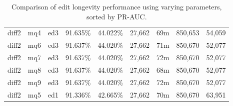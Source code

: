 \begin{sidewaystable}[!tp]
\begin{center}
\begin{tabular}{|c|c|c||c|c||c|c|c|c|}
diff2 & mq4 & ed3 & 91.635\% & 44.022\% & 27,662 & 69m & 850,653 & 54,059 \\
diff2 & mq6 & ed3 & 91.637\% & 44.020\% & 27,662 & 71m & 850,670 & 52,077 \\
diff2 & mq7 & ed3 & 91.637\% & 44.020\% & 27,662 & 72m & 850,670 & 52,077 \\
diff2 & mq8 & ed3 & 91.637\% & 44.020\% & 27,662 & 68m & 850,670 & 52,077 \\
diff2 & mq9 & ed3 & 91.637\% & 44.020\% & 27,662 & 72m & 850,670 & 52,077 \\
diff2 & mq5 & ed1 & 91.336\% & 42.665\% & 27,662 & 70m & 850,670 & 63,951 \\
\hline
\end{tabular}
\end{center}
\caption{Comparison of edit longevity performance using
    varying parameters, sorted by PR-AUC.}
\label{tab:editshout}
\end{sidewaystable}
